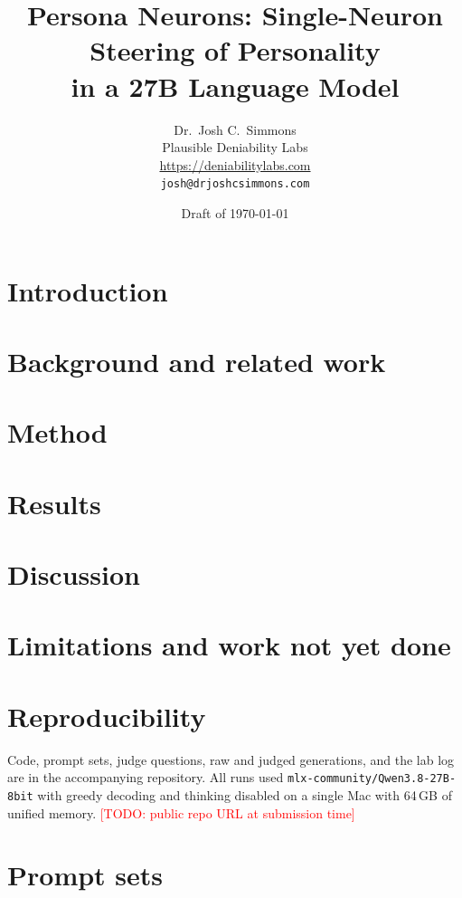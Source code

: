 \documentclass[11pt]{article}
\title{Persona Neurons: Single-Neuron Steering of Personality\\in a 27B Language Model}
\author{Dr.\ Josh C.\ Simmons\\
  Plausible Deniability Labs\\
  \url{https://deniabilitylabs.com}\\
  \texttt{josh@drjoshcsimmons.com}}
\date{Draft of \today}
\newcommand{\todo}[1]{\textcolor{red}{[TODO: #1]}}
\begin{document}
\maketitle

\begin{abstract}

\end{abstract}

\section{Introduction}


\section{Background and related work}


\section{Method}


\section{Results}


\section{Discussion}


\section{Limitations and work not yet done}


\section*{Reproducibility}
Code, prompt sets, judge questions, raw and judged generations, and the lab log are in the accompanying
repository. All runs used \texttt{mlx-community/Qwen3.8-27B-8bit} with greedy decoding and thinking disabled
on a single Mac with 64\,GB of unified memory. \todo{public repo URL at submission time}




\appendix
\section{Prompt sets}\label{app:prompts}

\end{document}
